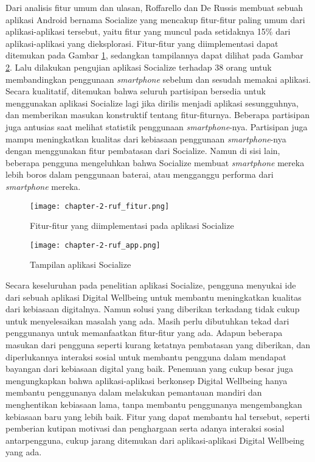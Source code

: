 Dari analisis fitur umum dan ulasan, Roffarello dan De Russis membuat sebuah aplikasi Android bernama Socialize yang mencakup fitur-fitur paling umum dari aplikasi-aplikasi tersebut, yaitu fitur yang muncul pada setidaknya 15\% dari aplikasi-aplikasi yang dieksplorasi. Fitur-fitur yang diimplementasi dapat ditemukan pada Gambar \ref{img:ruf_fitur}, sedangkan tampilannya dapat dilihat pada Gambar \ref{img:ruf_app}. Lalu dilakukan pengujian aplikasi Socialize terhadap 38 orang untuk membandingkan penggunaan \textit{smartphone} sebelum dan sesudah memakai aplikasi. Secara kualitatif, ditemukan bahwa seluruh partisipan bersedia untuk menggunakan aplikasi Socialize lagi jika dirilis menjadi aplikasi sesungguhnya, dan memberikan masukan konstruktif tentang fitur-fiturnya. Beberapa partisipan juga antusias saat melihat statistik penggunaan \textit{smartphone}-nya. Partisipan juga mampu meningkatkan kualitas dari kebiasaan penggunaan \textit{smartphone}-nya dengan menggunakan fitur pembatasan dari Socialize. Namun di sisi lain, beberapa pengguna mengeluhkan bahwa Socialize membuat \textit{smartphone} mereka lebih boros dalam penggunaan baterai, atau mengganggu performa dari \textit{smartphone} mereka.

\begin{figure}[h]
  \centering
  \texttt{[image: chapter-2-ruf\_fitur.png]}
  \caption{Fitur-fitur yang diimplementasi pada aplikasi Socialize \parencite{CHI2019SOCIALIZE}}
  \label{img:ruf_fitur}
\end{figure}

\begin{figure}[h]
  \centering
  \texttt{[image: chapter-2-ruf\_app.png]}
  \caption{Tampilan aplikasi Socialize \parencite{CHI2019SOCIALIZE}}
  \label{img:ruf_app}
\end{figure}

Secara keseluruhan pada penelitian aplikasi Socialize, pengguna menyukai ide dari sebuah aplikasi Digital Wellbeing untuk membantu meningkatkan kualitas dari kebiasaan digitalnya. Namun solusi yang diberikan terkadang tidak cukup untuk menyelesaikan masalah yang ada. Masih perlu dibutuhkan tekad dari penggunanya untuk memanfaatkan fitur-fitur yang ada. Adapun beberapa masukan dari pengguna seperti kurang ketatnya pembatasan yang diberikan, dan diperlukannya interaksi sosial untuk membantu pengguna dalam mendapat bayangan dari kebiasaan digital yang baik. Penemuan yang cukup besar juga mengungkapkan bahwa aplikasi-aplikasi berkonsep Digital Wellbeing hanya membantu penggunanya dalam melakukan pemantauan mandiri dan menghentikan kebiasaan lama, tanpa membantu penggunanya mengembangkan kebiasaan baru yang lebih baik. Fitur yang dapat membantu hal tersebut, seperti pemberian kutipan motivasi dan penghargaan serta adanya interaksi sosial antarpengguna, cukup jarang ditemukan dari aplikasi-aplikasi Digital Wellbeing yang ada.